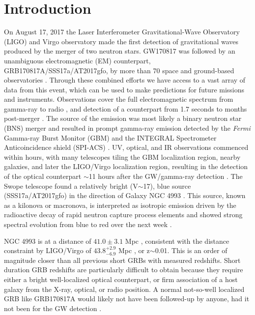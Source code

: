 \documentclass[modern]{aastex61}
\begin{document}
\section{Introduction} \label{sec:intro}
On August 17, 2017 the Laser Interferometer Gravitational-Wave Observatory (LIGO) and Virgo observatory made the first detection of gravitational waves produced by the merger of two neutron stars.  GW170817 was followed by an unambiguous electromagnetic (EM) counterpart, GRB170817A/SSS17a/AT2017gfo, by more than 70 space and ground-based observatories \citep{Abbott2017a,Abbott2017b,Abbott2017c}. Through these combined efforts we have access to a vast array of data from this event, which can be used to make predictions for future missions and instruments. Observations cover the full electromagnetic spectrum from gamma-ray to radio \citep{Goldstein2017,Savchenko2017,Troja2017,Evans2017,Coulter2017,Kim2017,Hallinan2017}, and detection of a counterpart from 1.7 seconds to months post-merger \citep{Abbott2017b,Ruan2017}. The source of the emission was most likely a binary neutron star (BNS) merger \citep{Abbott2017a} and resulted in prompt gamma-ray emission detected by the {\it Fermi} Gamma-ray Burst Monitor (GBM) \citep{Goldstein2017} and the INTEGRAL Spectrometer Anticoincidence shield (SPI-ACS) \citep{Savchenko2017}. UV, optical, and IR observations commenced within hours, with many telescopes tiling the GBM localization region, nearby galaxies, and later the LIGO/Virgo localization region, resulting in the detection of the optical counterpart $\sim$11 hours after the GW/gamma-ray detection \citep{Abbott2017c}. The Swope telescope found a relatively bright (V$\sim$17), blue source (SSS17a/AT2017gfo) in the direction of Galaxy NGC 4993 \citep{Coulter2017}. This source, known as a kilonova or macronova, is interpreted as isotropic emission driven by the radioactive decay of rapid neutron capture process elements and showed strong spectral evolution from blue to red over the next week \citep{Villar2017}.

NGC 4993 is at a distance of $41.0\pm3.1$ Mpc \citep{Hjorth2017}, consistent with the distance constraint by LIGO/Virgo of $43.8^{+2.9}_{-6.9}$ Mpc \citep{Abbott2017d}, or z$\sim$0.01.  This is an order of magnitude closer than all previous short GRBs with measured redshifts. Short duration GRB redshifts are particularly difficult to obtain because they require either a bright well-localized optical counterpart, or firm association of a host galaxy from the X-ray, optical, or radio position.  A normal not-so-well localized GRB like GRB170817A would likely not have been followed-up by anyone, had it not been for the GW detection \citep{Goldstein2017}.
\end{document}
